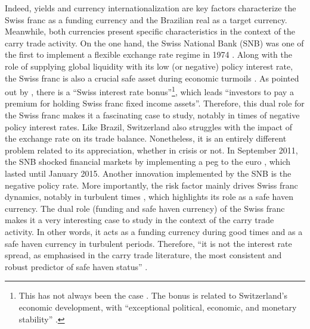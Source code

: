 \documentclass[a4paper, twoside]{templates/ociamthesis}
\begin{document}
Indeed, yields and currency internationalization are key factors characterize the Swiss franc as a funding currency and the Brazilian real as a target currency. Meanwhile, both currencies present specific characteristics in the context of the carry trade activity. On the one hand, the Swiss National Bank (SNB) was one of the first to implement a flexible exchange rate regime in 1974 \autocite{rossi2015}. Along with the role of supplying global liquidity with its low (or negative) policy interest rate, the Swiss franc is also a crucial safe asset during economic turmoils \autocites[see][]{galati2007,ranaldo2010,guillaumin2012}. As pointed out by \textcite[ 178]{baltensperger2017}, there is a ``Swiss interest rate bonus''\footnote{This has not always been the case \autocite[see][]{laurent2014}. The bonus is related to Switzerland's economic development, with ``exceptional political, economic, and monetary stability'' \autocite[ 178]{baltensperger2017}.}, which leads ``investors to pay a premium for holding Swiss franc fixed income assets''. Therefore, this dual role for the Swiss franc makes it a fascinating case to study, notably in times of negative policy interest rates. Like Brazil, Switzerland also struggles with the impact of the exchange rate on its trade balance. Nonetheless, it is an entirely different problem related to its appreciation, whether in crisis or not. In September 2011, the SNB shocked financial markets by implementing a peg to the euro \autocite{vallet2014}, which lasted until January 2015. Another innovation implemented by the SNB is the negative policy rate. More importantly, the risk factor mainly drives Swiss franc dynamics, notably in turbulent times \autocite{fink2022}, which highlights its role as a safe haven currency. The dual role (funding and safe haven currency) of the Swiss franc makes it a very interesting case to study in the context of the carry trade activity. In other words, it acts as a funding currency during good times and as a safe haven currency in turbulent periods. Therefore, ``it is not the interest rate spread, as emphasised in the carry trade literature, the most consistent and robust predictor of safe haven status'' \autocite[ 57]{habib2012}.
\end{document}
